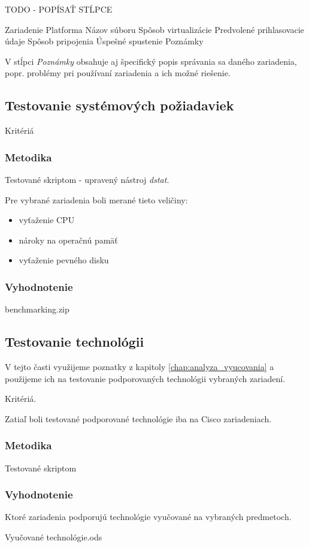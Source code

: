 {\huge TODO - POPÍSAŤ STĹPCE}

Zariadenie	Platforma	Názov súboru	Spôsob virtualizácie	Predvolené prihlasovacie údaje	Spôsob pripojenia	Úspešné spustenie	Poznámky


V stĺpci \emph{Poznámky} obsahuje aj špecifický popis správania sa daného zariadenia, popr. problémy pri používaní zariadenia a ich možné riešenie.

\subsection{Testovanie systémových požiadaviek}
\label{chap:testovanie_zariadeni_benchmark}

Kritériá

\subsubsection{Metodika}

Testované skriptom - upravený nástroj \emph{dstat}.


Pre vybrané zariadenia boli merané tieto veličiny:
\begin{itemize}
\item vyťaženie CPU
\item nároky na operačnú pamäť
\item vyťaženie pevného disku
\end{itemize}

\subsubsection{Vyhodnotenie}

benchmarking.zip

\subsection{Testovanie technológii}
\label{chap:testovanie_technologii}

V tejto časti využijeme poznatky z kapitoly \ref{chap:analyza_vyucovania} a použijeme ich na testovanie podporovaných technológii vybraných zariadení.

Kritériá.

Zatiaľ boli testované podporované technológie iba na Cisco zariadeniach.

\subsubsection{Metodika}

Testované skriptom

\subsubsection{Vyhodnotenie}

Ktoré zariadenia podporujú technológie vyučované na vybraných predmetoch.

Vyučované technológie.ods